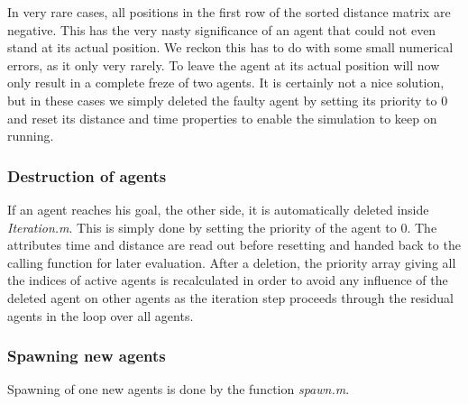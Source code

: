 \noi In very rare cases, all positions in the first row of the sorted distance matrix are negative. This has the very nasty significance of an agent that could not even stand at its actual position. We reckon this has to do with some small numerical errors, as it only very rarely. To leave the agent at its actual position will now only result in a complete freze of two agents. It is certainly not a nice solution, but in these cases we simply deleted the faulty agent by setting its priority to 0 and reset its distance and time properties to enable the simulation to keep on running.

\subsubsection{Destruction of agents}
If an agent reaches his goal, the other side, it is automatically deleted inside \textit{Iteration.m}. This is simply done by setting the priority of the agent to 0. The attributes time and distance are read out before resetting and handed back to the calling function for later evaluation. After a deletion, the priority array giving all the indices of active agents is recalculated in order to avoid any influence of the deleted agent on other agents as the iteration step proceeds through the residual agents in the loop over all agents.

\subsubsection{Spawning new agents}
Spawning of one new agents is done by the function \textit{spawn.m}.

